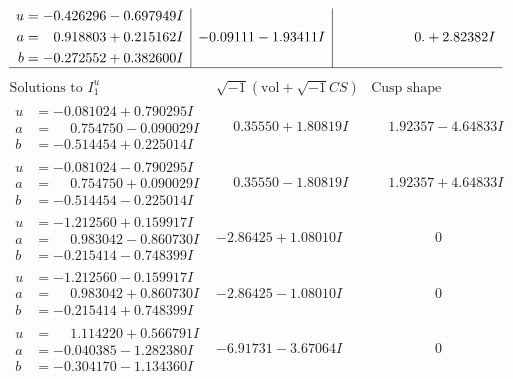 \documentclass[1p]{elsarticle_modified}
\theoremstyle{definition}
\newcommand{\I}{\sqrt{-1}}
\begin{document}
$$\begin{array}{c|c|c}
\begin{aligned}
u &= -0.426296 - 0.697949 I \\
a &= \phantom{-}0.918803 + 0.215162 I \\
b &= -0.272552 + 0.382600 I\end{aligned}
 & -0.09111 - 1.93411 I & \phantom{-0.000000 -}0. + 2.82382 I\\
 \hline 
 \end{array}$$\newpage$$\begin{array}{c|c|c}  
\text{Solutions to }I^u_{1}& \I (\text{vol} + \sqrt{-1}CS) & \text{Cusp shape}\\
 \hline 
\begin{aligned}
u &= -0.081024 + 0.790295 I \\
a &= \phantom{-}0.754750 - 0.090029 I \\
b &= -0.514454 + 0.225014 I\end{aligned}
 & \phantom{-}0.35550 + 1.80819 I & \phantom{-}1.92357 - 4.64833 I \\ \hline\begin{aligned}
u &= -0.081024 - 0.790295 I \\
a &= \phantom{-}0.754750 + 0.090029 I \\
b &= -0.514454 - 0.225014 I\end{aligned}
 & \phantom{-}0.35550 - 1.80819 I & \phantom{-}1.92357 + 4.64833 I \\ \hline\begin{aligned}
u &= -1.212560 + 0.159917 I \\
a &= \phantom{-}0.983042 - 0.860730 I \\
b &= -0.215414 - 0.748399 I\end{aligned}
 & -2.86425 + 1.08010 I & \phantom{-0.000000 } 0 \\ \hline\begin{aligned}
u &= -1.212560 - 0.159917 I \\
a &= \phantom{-}0.983042 + 0.860730 I \\
b &= -0.215414 + 0.748399 I\end{aligned}
 & -2.86425 - 1.08010 I & \phantom{-0.000000 } 0 \\ \hline\begin{aligned}
u &= \phantom{-}1.114220 + 0.566791 I \\
a &= -0.040385 - 1.282380 I \\
b &= -0.304170 - 1.134360 I\end{aligned}
 & -6.91731 - 3.67064 I & \phantom{-0.000000 } 0 \\ \hline\begin{aligned}

\end{aligned}
\end{array}$$
\end{document}
